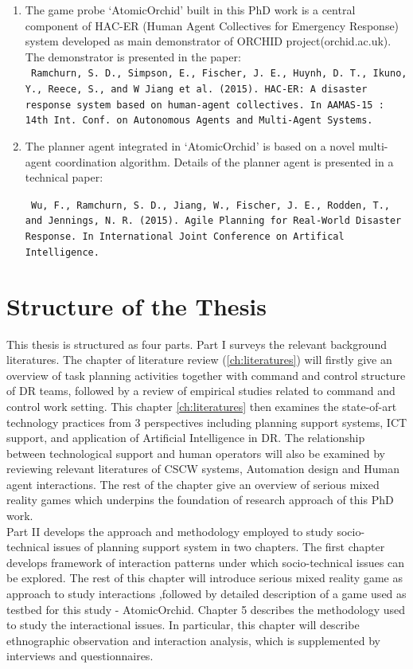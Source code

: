 \begin{enumerate}
\item The game probe `AtomicOrchid' built in this PhD work is a central component of HAC-ER (Human Agent Collectives for Emergency Response) system  developed as main demonstrator of ORCHID project(orchid.ac.uk). The demonstrator is presented in the paper:\\

\texttt{  Ramchurn, S. D., Simpson, E., Fischer, J. E., Huynh, D. T., Ikuno, Y., Reece, S., and  W Jiang et al. (2015). HAC-ER: A disaster response system based on human-agent collectives. In AAMAS-15 : 14th Int. Conf. on Autonomous Agents and Multi-Agent Systems.} \\ 


\item The planner agent integrated in `AtomicOrchid' is based on a novel multi-agent coordination algorithm. Details of the planner agent is presented in a technical paper: 

\texttt{ Wu, F., Ramchurn, S. D., Jiang, W., Fischer, J. E., Rodden, T., and Jennings, N. R. (2015). Agile Planning for Real-World Disaster Response. In International Joint Conference on Artifical Intelligence.}


\end{enumerate} 

\section{Structure of the Thesis}
This thesis is structured as four parts. Part I surveys the relevant background literatures. The chapter of literature review (\ref{ch:literatures}) will firstly give an overview of task planning activities together with command and control structure of DR teams, followed by a review of empirical studies related to command and control work setting. This chapter \ref{ch:literatures} then examines the state-of-art technology practices from 3 perspectives including planning support systems, ICT support, and application of Artificial Intelligence in DR. The relationship between technological support and human operators will also be examined by reviewing relevant literatures of CSCW systems, Automation design and Human agent interactions. The rest of the chapter give an overview of serious mixed reality games which underpins the foundation of research approach of this PhD work.\\

Part II develops the approach and methodology employed to study socio-technical issues of planning support system in two chapters. The first chapter develops framework of interaction patterns under which socio-technical issues can be explored. The rest of this chapter will introduce serious mixed reality game as approach to study interactions  ,followed by detailed description of a game used as testbed for this study - AtomicOrchid. Chapter 5 describes the methodology used to study the interactional issues. In particular, this chapter will describe ethnographic observation and interaction analysis, which is supplemented by interviews and questionnaires. \\ 

